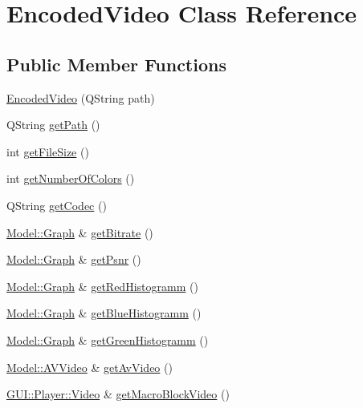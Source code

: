 \hypertarget{classModel_1_1EncodedVideo}{}\section{Encoded\+Video Class Reference}
\label{classModel_1_1EncodedVideo}
\subsection*{Public Member Functions}
\begin{DoxyCompactItemize}
\item 
\hyperlink{classModel_1_1EncodedVideo_a436d811c3c2420e132a2b4e04959c5de}{Encoded\+Video} (Q\+String path)
\item 
Q\+String \hyperlink{classModel_1_1EncodedVideo_a1a94d0c9bf9dd725556721ac914025e3}{get\+Path} ()
\item 
int \hyperlink{classModel_1_1EncodedVideo_ac4465cfb146410e557acc4892afd9e7c}{get\+File\+Size} ()
\item 
int \hyperlink{classModel_1_1EncodedVideo_ab9202ba7e871cc8488f73a14e4e6abef}{get\+Number\+Of\+Colors} ()
\item 
Q\+String \hyperlink{classModel_1_1EncodedVideo_ad0b9ca84489c31d0155646495380ac0b}{get\+Codec} ()
\item 
\hyperlink{classModel_1_1Graph}{Model\+::\+Graph} \& \hyperlink{classModel_1_1EncodedVideo_afe6efbe8e2d7312d31f9df848685c2a1}{get\+Bitrate} ()
\item 
\hyperlink{classModel_1_1Graph}{Model\+::\+Graph} \& \hyperlink{classModel_1_1EncodedVideo_a4c4816fa0fc4d120b7ca4727f92b8434}{get\+Psnr} ()
\item 
\hyperlink{classModel_1_1Graph}{Model\+::\+Graph} \& \hyperlink{classModel_1_1EncodedVideo_a2e964007d3803c23555685e582f1f8f8}{get\+Red\+Histogramm} ()
\item 
\hyperlink{classModel_1_1Graph}{Model\+::\+Graph} \& \hyperlink{classModel_1_1EncodedVideo_a665006efad68684718c78c213e081f16}{get\+Blue\+Histogramm} ()
\item 
\hyperlink{classModel_1_1Graph}{Model\+::\+Graph} \& \hyperlink{classModel_1_1EncodedVideo_a85d21a1922c274ff928b8794627fc3f0}{get\+Green\+Histogramm} ()
\item 
\hyperlink{classModel_1_1AVVideo}{Model\+::\+A\+V\+Video} \& \hyperlink{classModel_1_1EncodedVideo_a58bd43e5cbaa711bf19b0c71efbc9834}{get\+Av\+Video} ()
\item 
\hyperlink{classGUI_1_1Player_1_1Video}{G\+U\+I\+::\+Player\+::\+Video} \& \hyperlink{classModel_1_1EncodedVideo_a8efa1486dd7b968e9b0f1cb5be919381}{get\+Macro\+Block\+Video} ()

\end{DoxyCompactItemize}
